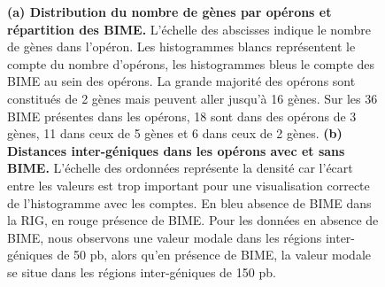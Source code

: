 \documentclass[12pt,a4paper]{report}
\begin{document}
\begin{onehalfspace}
\begin{figure}[ht]
\centering
{}
\caption{\textbf{(a) Distribution du nombre de gènes par opérons et répartition des BIME.} L'échelle des abscisses indique le nombre de gènes dans l'opéron. Les histogrammes blancs représentent le compte du nombre d'opérons, les histogrammes bleus le compte des BIME au sein des opérons. La grande majorité des opérons sont constitués de 2 gènes mais peuvent aller jusqu'à 16 gènes. Sur les 36 BIME présentes dans les opérons, 18 sont dans des opérons de 3 gènes, 11 dans ceux de 5 gènes et 6 dans ceux de 2 gènes. \textbf{(b) Distances inter-géniques dans les opérons avec et sans BIME.} L'échelle des ordonnées représente la densité car l'écart entre les valeurs est trop important pour une visualisation correcte de l'histogramme avec les comptes. En bleu absence de BIME dans la RIG, en rouge présence de BIME. Pour les données en absence de BIME, nous observons une valeur modale dans les régions inter-géniques de 50 pb, alors qu'en présence de BIME, la valeur modale se situe dans les régions inter-géniques de 150 pb.}

\end{figure}
\end{onehalfspace}
\end{document}
